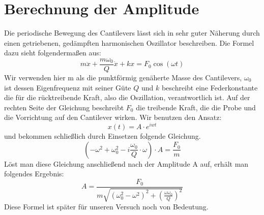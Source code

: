  
\section{Berechnung der Amplitude}
\label{herleitung}
 
Die periodische Bewegung des Cantilevers lässt sich in sehr guter Näherung durch einen getriebenen, gedämpften harmonischen Oszillator beschreiben. Die Formel dazu sieht folgendermaßen aus:
\[
    m \ddot{x} + \frac{m \omega_0}{Q} \dot{x} + kx = F_0 \cos(\omega t)
\]
Wir verwenden hier m als die punktförmig genäherte Masse des Cantilevers, $\omega_0$ ist dessen Eigenfrequenz mit seiner Güte $Q$ und $k$ beschreibt eine Federkonstante die für die rücktreibende Kraft, also die Oszillation, verantwortlich ist.
Auf der rechten Seite der Gleichung beschreibt $F_0$ die treibende Kraft, die die Probe und die Vorrichtung auf den Cantilever wirken.
Wir benutzen den Ansatz:
\[
    x(t)=A \cdot e^{iwt}
\]
und bekommen schließlich durch Einsetzen folgende Gleichung.
\[
   (-\omega^2+\omega_0^2-i\frac{\omega_0}{Q} \cdot \omega) \cdot A = \frac{F_0}{m}
\]
Löst man diese Gleichung anschließend nach der Amplitude A auf, erhält man folgendes Ergebnis:
\[
    A = \frac{F_0}{m \sqrt{ ( \omega_0^2 - \omega^2 )^2 + \left( \frac{\omega 
        \omega_0}{Q} \right)^2}}
\]
Diese Formel ist später für unseren Versuch noch von Bedeutung.
